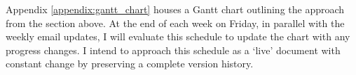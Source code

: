 Appendix \ref{appendix:gantt_chart} houses a Gantt chart outlining the approach from the section above. At the end of each week on Friday, in parallel with the weekly email updates, I will evaluate this schedule to update the chart with any progress changes. I intend to approach this schedule as a `live' document with constant change by preserving a complete version history.